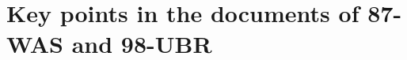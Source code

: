 \documentclass[preprint, 12pt]{elsarticle}
\providecommand{\DIFaddbegin}{} %
\begin{document}
\newpage
\appendix\label{appendix}

\section{Key points in the documents of 87-WAS and 98-UBR}\label{secS1}
\renewcommand{\thefigure}{A\arabic{figure}}
\renewcommand{\thetable}{A\arabic{table}}
\setcounter{figure}{0}
\setcounter{table}{0}

\DIFaddbegin
\end{document}
